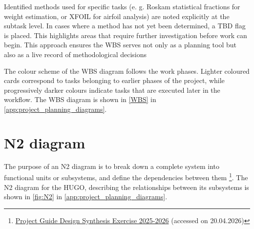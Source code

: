 Identified methods used for specific tasks (e. g. Roskam statistical fractions for weight estimation, or XFOIL for airfoil analysis) are noted explicitly at the subtask level.
In cases where a method has not yet been determined, a TBD flag is placed. This highlights areas that require further investigation before work can begin. This approach ensures the WBS serves not only as a planning tool but also as a live record of methodological decisions

The colour scheme of the WBS diagram follows the work phases. Lighter coloured cards correspond to tasks belonging to earlier phases of the project, while progressively darker colours indicate tasks that are executed later in the workflow. The WBS diagram is shown in \autoref{WBS} in \autoref{app:project_planning_diagrams}.

\section{N2 diagram}
\label{sec:n2_diagram}
The purpose of an N2 diagram is to break down a complete system into functional units or subsystems, and define the dependencies between them \footnote{\href{https://github.com/Teo-Cokonaj/DSE-28/blob/main/docs/Projects/Project_Guide_2025-2026_Spring_Saullo_Castro.pdf}{Project Guide Design Synthesis Exercise 2025-2026} (accessed on 20.04.2026)}. The N2 diagram for the HUGO, describing the relationships between its subsystems is shown in \autoref{fig:N2} in \autoref{app:project_planning_diagrams}.

% 



